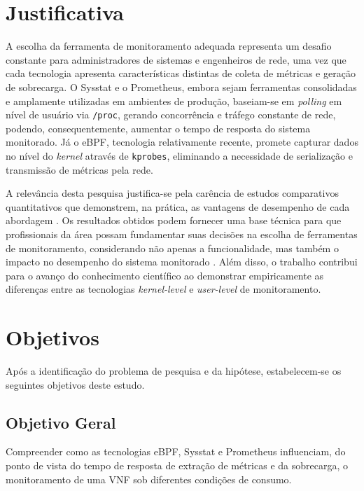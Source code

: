 \section{Justificativa}

A escolha da ferramenta de monitoramento adequada representa um desafio constante para administradores de sistemas e engenheiros de rede, uma vez que cada tecnologia apresenta características distintas de coleta de métricas e geração de sobrecarga. O Sysstat e o Prometheus, embora sejam ferramentas consolidadas e amplamente utilizadas em ambientes de produção, baseiam-se em \textit{polling} em nível de usuário via \texttt{/proc}, gerando concorrência e tráfego constante de rede, podendo, consequentemente, aumentar o tempo de resposta do sistema monitorado. Já o eBPF, tecnologia relativamente recente, promete capturar dados no nível do \textit{kernel} através de \texttt{kprobes}, eliminando a necessidade de serialização e transmissão de métricas pela rede.

A relevância desta pesquisa justifica-se pela carência de estudos comparativos quantitativos que demonstrem, na prática, as vantagens de desempenho de cada abordagem \cite{usman_observability_2022}. Os resultados obtidos podem fornecer uma base técnica para que profissionais da área possam fundamentar suas decisões na escolha de ferramentas de monitoramento, considerando não apenas a funcionalidade, mas também o impacto no desempenho do sistema monitorado \cite{10.23919}. Além disso, o trabalho contribui para o avanço do conhecimento científico ao demonstrar empiricamente as diferenças entre as tecnologias \textit{kernel-level} e \textit{user-level} de monitoramento.

\section{Objetivos}

Após a identificação do problema de pesquisa e da hipótese, estabelecem-se os seguintes objetivos deste estudo.

\subsection{Objetivo Geral}

Compreender como as tecnologias eBPF, Sysstat e Prometheus influenciam, do ponto de vista do tempo de resposta de extração de métricas e da sobrecarga, o monitoramento de uma VNF sob diferentes condições de consumo.

